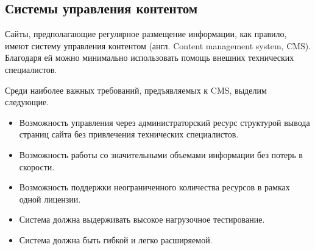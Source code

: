 \documentclass[a4paper,english,russian]{G2-105}
\begin{document}
\subsection{Системы управления контентом}
\par Сайты, предполагающие регулярное размещение информации, как правило, имеют систему управления контентом (англ. Content management system, CMS).  Благодаря ей можно минимально использовать помощь внешних технических специалистов.
\par Среди наиболее важных требований, предъявляемых к CMS,  выделим следующие.
\begin{itemize}
\item Возможность управления через администраторский ресурс структурой вывода страниц сайта без привлечения технических специалистов.
\item Возможность работы со значительными объемами информации без потерь в скорости.
\item Возможность поддержки неограниченного количества ресурсов в рамках одной лицензии.
\item Система должна выдерживать высокое нагрузочное тестирование.
\item Система должна быть гибкой и легко расширяемой.
\end{itemize}
\end{document}
